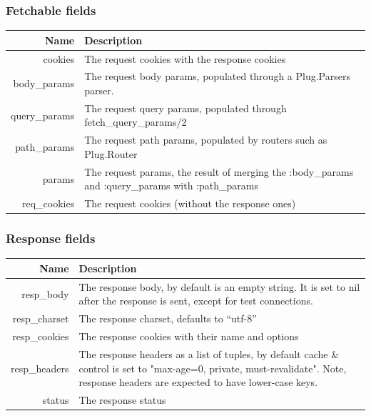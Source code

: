 \documentclass{beamer}
\begin{document}
\begin{frame}
\frametitle{Fetchable fields}
\begin{flushleft}
  \tiny
  \begin{tabular}{|r|p{3.5in}|}
  \hline
  \textbf{Name} & \textbf{Description} \\ \hline
  cookies       & The request cookies with the response cookies \\
  body\_params  & The request body params, populated through a Plug.Parsers parser. \\
  query\_params & The request query params, populated through fetch\_query\_params/2 \\
  path\_params  & The request path params, populated by routers such as Plug.Router \\
  params        & The request params, the result of merging the :body\_params and :query\_params with :path\_params \\
  req\_cookies  & The request cookies (without the response ones) \\\hline
  \end{tabular}
\end{flushleft}
\end{frame}

\begin{frame}
\frametitle{Response fields}
\begin{flushleft}
  \tiny
  \begin{tabular}{|r|p{3.5in}|}
    \hline
    \textbf{Name}  & \textbf{Description} \\ \hline
     resp\_body    & The response body, by default is an empty string. It is set to nil after the response is sent, except for test connections. \\
     resp\_charset & The response charset, defaults to “utf-8” \\
     resp\_cookies & The response cookies with their name and options \\
     resp\_headers & The response headers as a list of tuples, by default cache \& control is set to "max-age=0, private, must-revalidate". Note, response headers are expected to have lower-case keys. \\
     status        & The response status \\ \hline
     
  \end{tabular}
\end{flushleft}

\end{frame}
\end{document}

